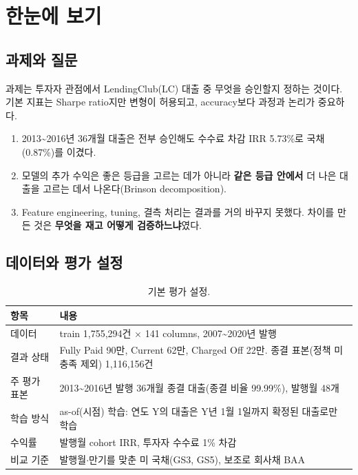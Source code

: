 \chapter{한눈에 보기}

\section{과제와 질문}
과제는 투자자 관점에서 LendingClub(LC) 대출 중 무엇을 승인할지 정하는 것이다. 기본 지표는 Sharpe ratio지만 변형이 허용되고, accuracy보다 과정과 논리가 중요하다.

\begin{keybox}[이 문서의 결론 세 줄]
\begin{enumerate}
\item 2013\textasciitilde 2016년 36개월 대출은 전부 승인해도 수수료 차감 IRR 5.73\%로 국채(0.87\%)를 이겼다.
\item 모델의 추가 수익은 좋은 등급을 고르는 데가 아니라 \textbf{같은 등급 안에서} 더 나은 대출을 고르는 데서 나온다(Brinson decomposition).
\item Feature engineering, tuning, 결측 처리는 결과를 거의 바꾸지 못했다. 차이를 만든 것은 \textbf{무엇을 재고 어떻게 검증하느냐}였다.
\end{enumerate}
\end{keybox}

\section{데이터와 평가 설정}
\begin{table}[H]\centering\small
\begin{tabularx}{\linewidth}{@{}lL@{}}\toprule
항목 & 내용\\\midrule
데이터 & train 1,755,294건 \ensuremath{\times} 141 columns, 2007\textasciitilde 2020년 발행\\
결과 상태 & Fully Paid 90만, Current 62만, Charged Off 22만. 종결 표본(정책 미충족 제외) 1,116,156건\\
주 평가 표본 & 2013\textasciitilde 2016년 발행 36개월 종결 대출(종결 비율 99.99\%), 발행월 48개\\
학습 방식 & as-of(시점) 학습: 연도 Y의 대출은 Y년 1월 1일까지 확정된 대출로만 학습\\
수익률 & 발행월 cohort IRR, 투자자 수수료 1\% 차감\\
비교 기준 & 발행월\ensuremath{\cdot}만기를 맞춘 미 국채(GS3, GS5), 보조로 회사채 BAA\\\bottomrule
\end{tabularx}
\caption{기본 평가 설정.}
\end{table}

